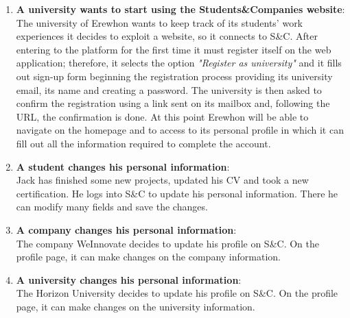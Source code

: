 \begin{enumerate}
            \item \textbf{A university wants to start using the Students\&Companies website}:
            \\The university of Erewhon wants to keep track of its students' work experiences it decides to exploit a website, so it connects to S\&C. After entering to the platform for the first time it must register itself on the web application; therefore, it selects the option \textit{"Register as university"} and it fills out sign-up form beginning the registration process providing its university email, its name and creating a password. The university is then asked to confirm the registration using a link sent on its mailbox and, following the URL, the confirmation is done. At this point Erewhon will be able to navigate on the homepage and to access to its personal profile in which it can fill out all the information required to complete the account.
         
            \item \textbf{A student changes his personal information}:
            \\ Jack has finished some new projects, updated his CV and took a new certification. He logs into S\&C to update his personal information. There he can modify many fields and save the changes. 
            
            \item \textbf{A company changes his personal information}:
            \\ The company WeInnovate decides to update his profile on S\&C. On the profile page, it can make changes on the company information.  

            \item \textbf{A university changes his personal information}:
            \\ The Horizon University decides to update his profile on S\&C. On the profile page, it can make changes on the university information.
            

\end{enumerate}

